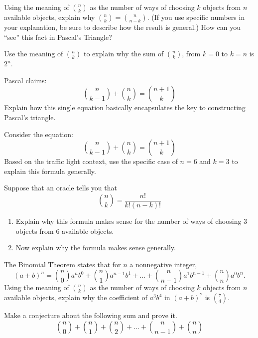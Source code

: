 \documentclass[nooutcomes,noauthor]{ximera}
\begin{document}
\begin{problem}
Using the meaning of $\binom{n}{k}$ as the number of ways of choosing $k$ objects from $n$ available objects, explain why $\binom{n}{k} = \binom{n}{n-k}$.  (If you use specific numbers in your explanation, be sure to describe how the result is general.)  How can you ``see'' this fact in Pascal's Triangle?  
\end{problem}

\begin{problem}
Use the meaning of $\binom{n}{k}$ to explain why the sum of $\binom{n}{k}$, from $k=0$ to $k=n$ is $2^n$.
\end{problem}

\begin{problem}
Pascal claims:
\[
\binom{n}{k-1} +  \binom{n}{k} = \binom{n+1}{k}
\]
Explain how this single equation basically encapsulates the key
to constructing Pascal's triangle.
\end{problem}

\begin{problem}
Consider the equation:  
\[
\binom{n}{k-1} +  \binom{n}{k} = \binom{n+1}{k}
\]
Based on the traffic light context, use the specific case of $n=6$ and $k=3$ to explain this formula generally.  
\end{problem}

\begin{problem}
Suppose that an oracle tells you that
\[
\binom{n}{k} = \frac{n!}{k!(n-k)!}
\]
\begin{enumerate}
\item Explain why this formula makes sense for the number of ways of choosing $3$ objects from $6$ available objects.  
\item Now explain why the formula makes sense generally.  
\end{enumerate}
\end{problem}


\begin{problem}
The Binomial Theorem states that for $n$ a nonnegative integer, 
\[
(a+b)^n = \binom{n}{0} a^nb^0 + \binom{n}{1} a^{n-1}b^1 + \dots + \binom{n}{n-1} a^{1}b^{n-1} + \binom{n}{n} a^{0}b^n.   
\]
Using the meaning of $\binom{n}{k}$ as the number of ways of choosing $k$ objects from $n$ available objects, explain 
why the coefficient of $a^3b^4$ in $(a+b)^7$ is $\binom{7}{4}$.  
\end{problem}

\begin{problem}
Make a conjecture about the following sum and prove it.  
\[
\binom{n}{0} + \binom{n}{1} + \binom{n}{2} + \dots + \binom{n}{n-1}  + \binom{n}{n} 
\]
\end{problem}
\end{document}
